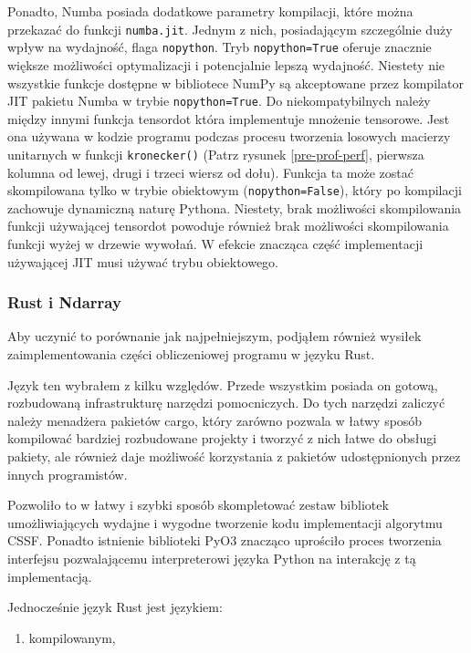 \documentclass[11pt, a4paper]{article}
\newcommand{\code}[1]{\texttt{#1}}
\begin{document}
\begin{sloppypar}
    Ponadto, Numba posiada dodatkowe parametry kompilacji, które można przekazać do funkcji
    \code{numba.jit}. Jednym z nich, posiadającym szczególnie duży wpływ na wydajność, flaga
    \code{nopython}. Tryb \code{nopython=True} oferuje znacznie większe możliwości
    optymalizacji i potencjalnie lepszą wydajność. Niestety nie wszystkie funkcje dostępne
    w bibliotece NumPy są akceptowane przez kompilator JIT pakietu Numba w trybie \code{nopython=True}.
    Do niekompatybilnych należy między innymi funkcja tensordot która implementuje mnożenie
    tensorowe. Jest ona używana w kodzie programu podczas procesu tworzenia losowych
    macierzy unitarnych w funkcji \code{kronecker()} (Patrz rysunek \ref{pre-prof-perf},
    pierwsza kolumna od lewej, drugi i trzeci wiersz od dołu). Funkcja ta może zostać
    skompilowana tylko w trybie obiektowym (\code{nopython=False}), który po kompilacji
    zachowuje dynamiczną naturę Pythona. Niestety, brak możliwości skompilowania funkcji
    używającej tensordot powoduje również brak możliwości skompilowania funkcji wyżej w
    drzewie wywołań. W efekcie znacząca część implementacji używającej JIT musi używać trybu
    obiektowego.

    \subsubsection{Rust i Ndarray}
    Aby uczynić to porównanie jak najpełniejszym, podjąłem również wysiłek
    zaimplementowania części obliczeniowej programu w języku Rust.

    Język ten wybrałem z kilku względów. Przede wszystkim posiada on gotową, rozbudowaną
    infrastrukturę narzędzi pomocniczych. Do tych narzędzi zaliczyć należy menadżera pakietów
    cargo, który zarówno pozwala w łatwy sposób kompilować bardziej rozbudowane projekty
    i tworzyć z nich łatwe do obsługi pakiety, ale również daje możliwość korzystania z pakietów
    udostępnionych przez innych programistów.

    Pozwoliło to w łatwy i szybki sposób skompletować zestaw bibliotek umożliwiających wydajne
    i wygodne tworzenie kodu implementacji algorytmu CSSF. Ponadto istnienie biblioteki
    PyO3 znacząco uprościło proces tworzenia interfejsu pozwalającemu interpreterowi
    języka Python na interakcję z tą implementacją.

    Jednocześnie język Rust jest językiem:
    \begin{enumerate}
      \item kompilowanym,


\end{enumerate}
\end{sloppypar}
\end{document}
